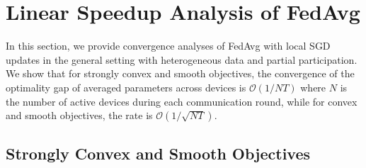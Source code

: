 


\section{Linear Speedup Analysis of FedAvg}
\label{sec:sgd}

In this section, we provide convergence analyses of FedAvg with local
SGD updates in the general setting with heterogeneous data and partial
participation. We show that for strongly convex and smooth objectives,
the convergence of the optimality gap of averaged parameters across
devices is $\mathcal{O}(1/NT)$ where $N$ is the number of active
devices during each communication round, while for convex and smooth
objectives, the rate is $\mathcal{O}(1/\sqrt{NT})$. 

\subsection{Strongly Convex and Smooth Objectives}

